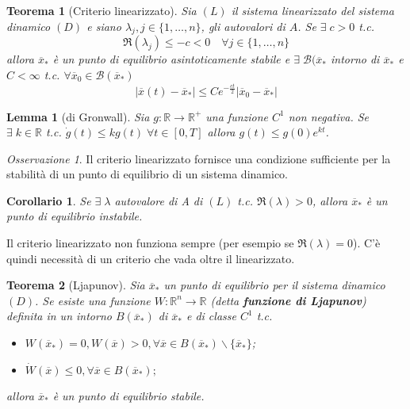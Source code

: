 \documentclass{book}
\theoremstyle{plain}
\newtheorem{teo}{Teorema}[chapter]
\theoremstyle{plain}
\newtheorem*{lemma}{Lemma}
\theoremstyle{plain}
\theoremstyle{plain}
\newtheorem*{cor}{Corollario}
\theoremstyle{plain}
\theoremstyle{definition}
\theoremstyle{remark}
\newtheorem*{oss}{Osservazione}
\theoremstyle{definition}
\begin{document}
\begin{teo}[Criterio linearizzato]
    Sia $(L)$ il sistema linearizzato del sistema dinamico $(D)$ e siano $\lambda_j, j\in\{1,\ldots,n\}$, gli autovalori di $A$. Se $\exists \; c>0$ t.c.
    \begin{displaymath}
    \boxed{
        \Re(\lambda_j) \leq -c <0 \quad \forall j\in\{1,\ldots,n\}
        }
    \end{displaymath}
    allora $\overline{x}_*$ è un punto di equilibrio asintoticamente stabile e $\exists\;\mathcal{B}(\overline{x}_*$ intorno di $\overline{x}_*$ e $C<\infty$ t.c. $\forall \overline{x}_0\in\mathcal{B}(\overline{x}_*)$
    \begin{displaymath}
        \boxed{
        |\overline{x}(t)-\overline{x}_*|\leq Ce^{-\frac{ct}{2}} |\overline{x}_0-\overline{x}_*|
        }
    \end{displaymath}
\end{teo}

\begin{lemma}[di Gronwall]
    Sia $g:\mathbb{R}\to\mathbb{R}^+$ una funzione $C^1$ non negativa. Se $\exists\;k\in\mathbb{R}$ t.c. $\Dot{g}(t)\leq kg(t)\;\forall t\in [0,T]$ allora $g(t)\leq g(0)e^{kt}$.
\end{lemma}

\begin{oss}
    Il criterio linearizzato fornisce una condizione sufficiente per la stabilità di un punto di equilibrio di un sistema dinamico.
\end{oss}

\begin{cor}
    Se $\exists \; \lambda$ autovalore di A di $(L)$  t.c. $\Re(\lambda)>0$, allora $\overline{x}_*$ è un punto di equilibrio instabile.
\end{cor}

\noindent Il criterio linearizzato non funziona sempre (per esempio se $\Re(\lambda)=0$). C'è quindi necessità di un criterio che vada oltre il linearizzato.

\begin{teo}[Ljapunov]
    Sia $\overline{x}_*$ un punto di equilibrio per il sistema dinamico $(D)$. Se esiste una funzione $W:\mathbb{R}^n\to\mathbb{R}$ (detta \textbf{funzione di Ljapunov}) definita in un intorno $B(\overline{x}_*)$ di $\overline{x}_*$ e di classe $C^1$ t.c.
    \begin{itemize}
        \item $W(\overline{x}_*) = 0, W(\overline{x})>0, \forall \overline{x} \in B(\overline{x}_*)\backslash\{\overline{x}_*\}$;
        \item $\dot{W}(\overline{x})\leq 0, \forall \overline{x} \in B(\overline{x}_*);$
    \end{itemize}
    allora $\overline{x}_*$ è un punto di equilibrio stabile.
\end{teo}
\end{document}
